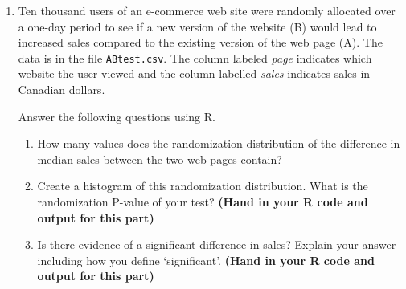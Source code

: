 \documentclass[11pt, oneside]{article}   	%
\begin{document}
\begin{enumerate}
\begin{enumerate}
{\bf Question:}  Find the least-squares estimates of the weights and standard error of the weights using this design.  

\item Does {\bf DESIGN II} determine the weights of the objects with equal precison compared to {\bf DESIGN I}?  Explain your reasoning.

\end{enumerate}

\newpage

\item Ten thousand users of an e-commerce web site were randomly allocated over a one-day period to see if a new version of the website (B) would lead to increased sales compared to the existing version of the web page (A).   The data is in the file \texttt{ABtest.csv}.  The column labeled {\it page} indicates which website the user viewed and the column labelled {\it sales} indicates sales in Canadian dollars.


Answer the following questions using R. 

\begin{enumerate}
\item  How many values does the randomization distribution of the difference in median sales between the two web pages contain?  
\item  Create a histogram of this randomization distribution.  What is the randomization P-value of your test? {\bf (Hand in your R code and output for this part)}
\item  Is there evidence of a significant difference in sales?  Explain your answer including how you define `significant'. {\bf (Hand in your R code and output for this part)}


\end{enumerate}





\end{enumerate}
\end{document}
